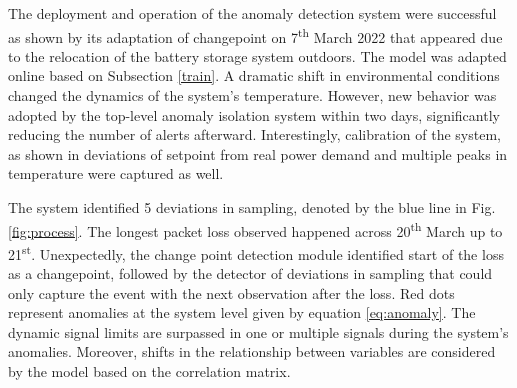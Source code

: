 The deployment and operation of the anomaly detection system were successful as shown by its adaptation of changepoint on 7\textsuperscript{th} March 2022 that appeared due to the relocation of the battery storage system outdoors. The model was adapted online based on Subsection \ref{train}. A dramatic shift in environmental conditions changed the dynamics of the system's temperature. However, new behavior was adopted by the top-level anomaly isolation system within two days, significantly reducing the number of alerts afterward. Interestingly, calibration of the system, as shown in deviations of setpoint from real power demand and multiple peaks in temperature were captured as well.

The system identified 5 deviations in sampling, denoted by the blue line in Fig. \ref{fig:process}. The longest packet loss observed happened across 20\textsuperscript{th} March up to 21\textsuperscript{st}. Unexpectedly, the change point detection module identified start of the loss as a changepoint, followed by the detector of deviations in sampling that could only capture the event with the next observation after the loss. Red dots represent anomalies at the system level given by equation \eqref{eq:anomaly}. The dynamic signal limits are surpassed in one or multiple signals during the system's anomalies. Moreover, shifts in the relationship between variables are considered by the model based on the correlation matrix.
